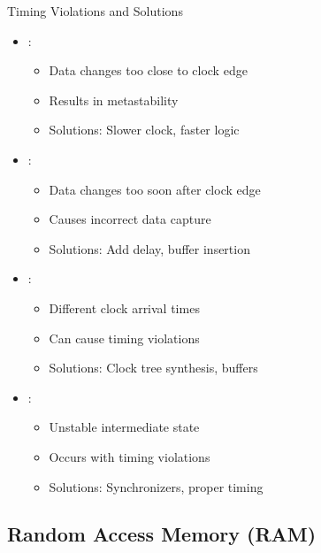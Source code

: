 \begin{frame}{Timing Violations and Solutions}
\begin{itemize}
\item {}:
\begin{itemize}
\item Data changes too close to clock edge
\item Results in metastability
\item Solutions: Slower clock, faster logic
\end{itemize}
\vspace{0.3cm}
\item {}:
\begin{itemize}
\item Data changes too soon after clock edge
\item Causes incorrect data capture
\item Solutions: Add delay, buffer insertion
\end{itemize}
\vspace{0.3cm}
\item {}:
\begin{itemize}
\item Different clock arrival times
\item Can cause timing violations
\item Solutions: Clock tree synthesis, buffers
\end{itemize}
\vspace{0.3cm}
\item {}:
\begin{itemize}
\item Unstable intermediate state
\item Occurs with timing violations
\item Solutions: Synchronizers, proper timing
\end{itemize}
\end{itemize}
\end{frame}

\subsection{Random Access Memory (RAM)}


